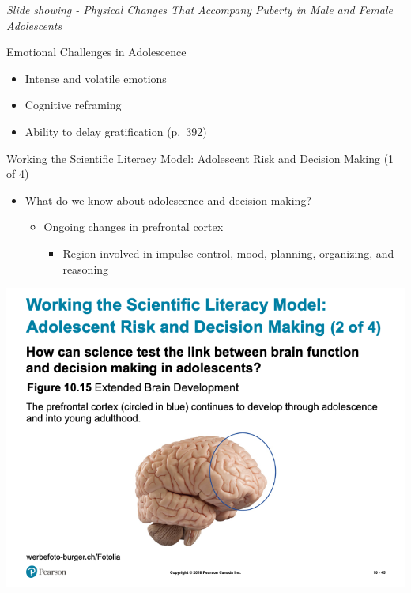 \documentclass[
]{book}
\providecommand{\tightlist}{%
  \setlength{\itemsep}{0pt}\setlength{\parskip}{0pt}}
\begin{document}
\begin{reflect}
\emph{Slide showing - Physical Changes That Accompany Puberty in Male and Female Adolescents}

Emotional Challenges in Adolescence

\begin{itemize}
\tightlist
\item
  Intense and volatile emotions\\
\item
  Cognitive reframing\\
\item
  Ability to delay gratification (p.~392)
\end{itemize}

Working the Scientific Literacy Model: Adolescent Risk and Decision Making (1 of 4)

\begin{itemize}
\tightlist
\item
  What do we know about adolescence and decision making?

  \begin{itemize}
  \tightlist
  \item
    Ongoing changes in prefrontal cortex

    \begin{itemize}
    \tightlist
    \item
      Region involved in impulse control, mood, planning, organizing, and reasoning
    \end{itemize}
  \end{itemize}
\end{itemize}

\includegraphics{assets/unit_3/slide_45.png}


\end{reflect}
\end{document}
